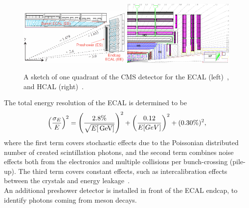 \begin{figure}[hbtp]
 \centering
 \includegraphics[width=0.49\textwidth]{figures/general/ecal}
 \includegraphics[width=0.49\textwidth]{figures/general/hcal}
 \caption{A sketch of one quadrant of the CMS detector for the ECAL (left)~\cite{ECALPicture}, and HCAL (right)~\cite{CMS}.}
 \label{fig:etaPlaneCMS}
\end{figure}
The total energy resolution of the ECAL is determined to be
\begin{equation}
 \left(\frac{\sigma_E}{E}\right)^2=\left(\frac{2.8\%}{\sqrt{E[\,\text{Ge\hspace{-.08em}V}]}}\right)^2 + \left(\frac{0.12}{E[GeV]}\right)^2 + (0.30\%)^2,
\end{equation}
where the first term covers stochastic effects due to the Poissonian distributed number of created scintillation photons, and the second term combines noise effects both from the electronics and multiple collisions per bunch-crossing (pile-up). The third term covers constant effects, such as intercalibration effects between the crystals and energy leakage~\cite{ECALRes}.\\
An additional preshower detector is installed in front of the ECAL endcap, to identify photons coming from meson decays.


